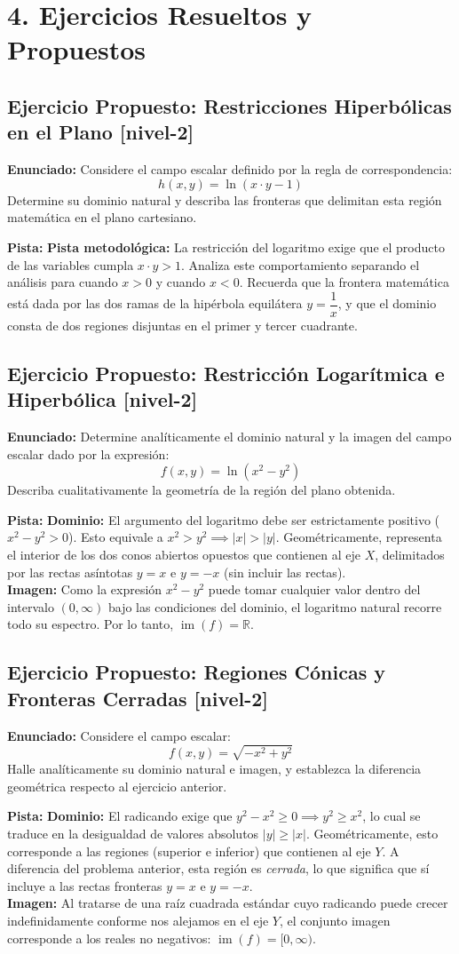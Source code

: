 \documentclass[11pt]{article}
\newenvironment{ejercicios}{%
  \section*{4. Ejercicios Resueltos y Propuestos}%
}{}
\newenvironment{ejerciciopropuesto}[2]{\subsection*{Ejercicio Propuesto: #1 \small{[#2]}}}{}
\newcommand{\enunciado}[1]{\textbf{Enunciado:} #1\par\vspace{0.2cm}}
\newcommand{\pista}[1]{\textbf{Pista:} #1\par\vspace{0.4cm}}
\begin{document}
\begin{ejercicios}
  \begin{ejerciciopropuesto}{Restricciones Hiperbólicas en el Plano}{nivel-2}
    \enunciado{
      Considere el campo escalar definido por la regla de correspondencia:
      $$ h(x,y) = \ln(x \cdot y - 1) $$
      Determine su dominio natural y describa las fronteras que delimitan esta región matemática en el plano cartesiano.
    }
    \pista{
      \textbf{Pista metodológica:} La restricción del logaritmo exige que el producto de las variables cumpla $x \cdot y > 1$. Analiza este comportamiento separando el análisis para cuando $x > 0$ y cuando $x < 0$. Recuerda que la frontera matemática está dada por las dos ramas de la hipérbola equilátera $y = \dfrac{1}{x}$, y que el dominio consta de dos regiones disjuntas en el primer y tercer cuadrante.
    }
  \end{ejerciciopropuesto}

  \begin{ejerciciopropuesto}{Restricción Logarítmica e Hiperbólica}{nivel-2}
    \enunciado{
      Determine analíticamente el dominio natural y la imagen del campo escalar dado por la expresión:
      $$ f(x,y) = \ln(x^2 - y^2) $$
      Describa cualitativamente la geometría de la región del plano obtenida.
    }
    \pista{
      \textbf{Dominio:} El argumento del logaritmo debe ser estrictamente positivo ($x^2 - y^2 > 0$). Esto equivale a $x^2 > y^2 \implies |x| > |y|$. Geométricamente, representa el interior de los dos conos abiertos opuestos que contienen al eje $X$, delimitados por las rectas asíntotas $y = x$ e $y = -x$ (sin incluir las rectas). \\
      \textbf{Imagen:} Como la expresión $x^2 - y^2$ puede tomar cualquier valor dentro del intervalo $(0, \infty)$ bajo las condiciones del dominio, el logaritmo natural recorre todo su espectro. Por lo tanto, $\operatorname{im}(f) = \mathbb{R}$.
    }
  \end{ejerciciopropuesto}

  \begin{ejerciciopropuesto}{Regiones Cónicas y Fronteras Cerradas}{nivel-2}
    \enunciado{
      Considere el campo escalar:
      $$ f(x,y) = \sqrt{-x^2 + y^2} $$
      Halle analíticamente su dominio natural e imagen, y establezca la diferencia geométrica respecto al ejercicio anterior.
    }
    \pista{
      \textbf{Dominio:} El radicando exige que $y^2 - x^2 \geq 0 \implies y^2 \geq x^2$, lo cual se traduce en la desigualdad de valores absolutos $|y| \geq |x|$. Geométricamente, esto corresponde a las regiones (superior e inferior) que contienen al eje $Y$. A diferencia del problema anterior, esta región es \textit{cerrada}, lo que significa que sí incluye a las rectas fronteras $y = x$ e $y = -x$. \\
      \textbf{Imagen:} Al tratarse de una raíz cuadrada estándar cuyo radicando puede crecer indefinidamente conforme nos alejamos en el eje $Y$, el conjunto imagen corresponde a los reales no negativos: $\operatorname{im}(f) = [0, \infty)$.
    }
  \end{ejerciciopropuesto}


\end{ejercicios}
\end{document}
